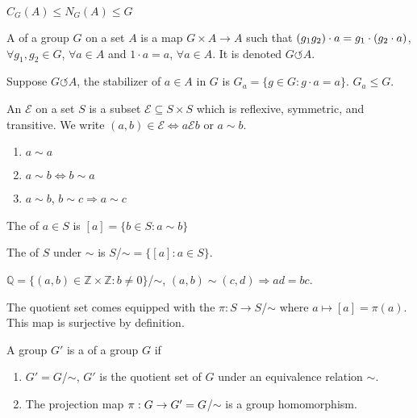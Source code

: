 \documentclass[11pt,letterpaper]{jacky}
\begin{document}
\begin{prop}
    $C_G(A)\le N_G(A)\le G$
\end{prop}

\begin{defi}
    A  of a group $G$ on a set $A$ is a map $G\times A\rightarrow A$ such that $(g_1g_2)\cdot a=g_1\cdot\pn{g_2\cdot a}$, $\forall g_1,g_2\in G$, $\forall a\in A$ and $1\cdot a=a$, $\forall a\in A$. It is denoted $G\circlearrowleft A$.
\end{defi}

\begin{defi}
    Suppose $G\circlearrowleft A$, the stabilizer of $a\in A$ in $G$ is $G_a=\{g\in G:g\cdot a=a\}$. $G_a\le G$.
\end{defi}

\begin{bdefi}
    An  $\mathcal{E}$ on a set $S$ is a subset $\mathcal{E}\subseteq S\times S$ which is reflexive, symmetric, and transitive. We write $(a,b)\in\mathcal{E}\Leftrightarrow a\mathrel\mathcal{E}b$ or $a\sim b$.
    \begin{enumerate}
        \item $a\sim a$
        \item $a\sim b\Leftrightarrow b\sim a$
        \item $a\sim b$, $b\sim c\Rightarrow a\sim c$
    \end{enumerate}
\end{bdefi}

\begin{defi}
    The  of $a\in S$ is $[a]=\{b\in S:a\sim b\}$
\end{defi}

\begin{defi}
    The  of $S$ under $\sim$ is $S$/$\sim=\{[a]:a\in S\}$.
\end{defi}

\begin{ex}
    $\mathbb{Q}=\{(a,b)\in\mathbb{Z}\times\mathbb{Z}:b\ne 0\}$/$\sim$, $(a,b)\sim(c,d)\Rightarrow ad=bc$.
\end{ex}

\begin{defi}
    The quotient set comes equipped with the  $\pi:S\rightarrow S$/$\sim$ where $a\mapsto[a]=\pi(a)$. This map is surjective by definition.
\end{defi}

\begin{bdefi}
    A group $G'$ is a  of a group $G$ if
    \begin{enumerate}
        \item $G'=G$/$\sim$, $G'$ is the quotient set of $G$ under an equivalence relation $\sim$.
        \item The projection map $\hmap[\pi]{G}{G'}=G$/$\sim$ is a group homomorphism.
    \end{enumerate}
\end{bdefi}
\end{document}
